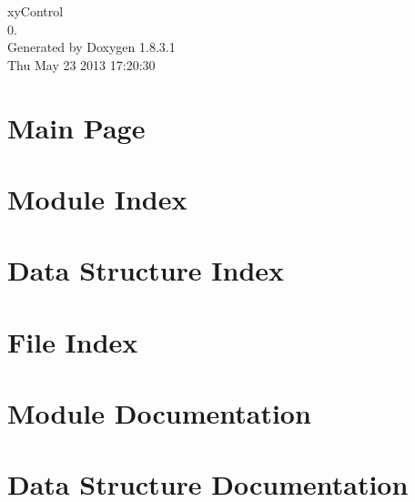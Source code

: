 \documentclass{book}
\begin{document}
\hypersetup{pageanchor=false,citecolor=blue}
\begin{titlepage}
\vspace*{7cm}
\begin{center}
{\Large xy\-Control \\[1ex]\large 0. }\\
\vspace*{1cm}
{\large Generated by Doxygen 1.8.3.1}\\
\vspace*{0.5cm}
{\small Thu May 23 2013 17:20:30}\\
\end{center}
\end{titlepage}
\clearemptydoublepage
{}
\tableofcontents
\clearemptydoublepage
{}
\hypersetup{pageanchor=true,citecolor=blue}
\chapter{Main Page}
\label{index}\hypertarget{index}{}
\chapter{Module Index}

\chapter{Data Structure Index}

\chapter{File Index}

\chapter{Module Documentation}

























\chapter{Data Structure Documentation}








\end{document}
